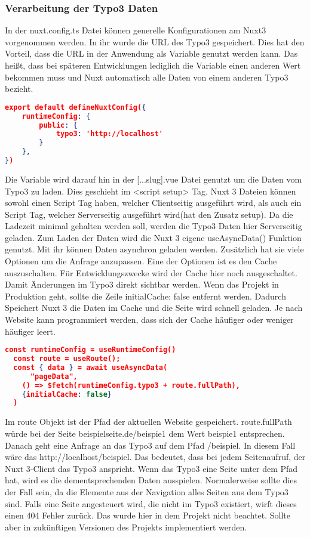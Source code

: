\subsubsection{Verarbeitung der Typo3 Daten}
\label{sec:Verarbeitung der Typo3 Daten}

In der nuxt.config.ts Datei können generelle Konfigurationen am Nuxt3 vorgenommen werden. In ihr wurde die URL des Typo3 gespeichert. Dies hat den Vorteil, dass die URL in der Anwendung als Variable genutzt werden kann. Das heißt, dass bei späteren Entwicklungen lediglich die Variable einen anderen Wert bekommen muss und Nuxt automatisch alle Daten von einem anderen Typo3 bezieht.

\begin{lstlisting}[language=json,firstnumber=1]
export default defineNuxtConfig({
    runtimeConfig: {
        public: {
            typo3: 'http://localhost'
        }
    },
})
\end{lstlisting}

Die Variable wird darauf hin in der [...slug].vue Datei genutzt um die Daten vom Typo3 zu laden. Dies geschieht im <script setup> Tag. Nuxt 3 Dateien können sowohl einen Script Tag haben, welcher Clientseitig ausgeführt wird, als auch ein Script Tag, welcher Serverseitig ausgeführt wird(hat den Zusatz setup). Da die Ladezeit minimal gehalten werden soll, werden die Typo3 Daten hier Serverseitig geladen. Zum Laden der Daten wird die Nuxt 3 eigene useAsyncData() Funktion genutzt. Mit ihr können Daten asynchron geladen werden. Zusätzlich hat sie viele Optionen um die Anfrage anzupassen. Eine der Optionen ist es den Cache auszuschalten. Für Entwicklungszwecke wird der Cache hier noch ausgeschaltet. Damit Änderungen im Typo3 direkt sichtbar werden. Wenn das Projekt in Produktion geht, sollte die Zeile {initialCache: false} entfernt werden. Dadurch Speichert Nuxt 3 die Daten im Cache und die Seite wird schnell geladen. Je nach Website kann programmiert werden, dass sich der Cache häufiger oder weniger häufiger leert.

\begin{lstlisting}[language=json,firstnumber=1]
  const runtimeConfig = useRuntimeConfig()
  const route = useRoute();
  const { data } = await useAsyncData(
      "pageData",
    () => $fetch(runtimeConfig.typo3 + route.fullPath),
    {initialCache: false}
  )
\end{lstlisting}

Im route Objekt ist der Pfad der aktuellen Website gespeichert. route.fullPath würde bei der Seite beispielseite.de/beispie1 dem Wert beispie1 entsprechen. Danach geht eine Anfrage an das Typo3 auf dem Pfad /beispiel. In diesem Fall wäre das http://localhost/beispiel. Das bedeutet, dass bei jedem Seitenaufruf, der Nuxt 3-Client das Typo3 anspricht. Wenn das Typo3 eine Seite unter dem Pfad hat, wird es die dementsprechenden Daten ausspielen. Normalerweise sollte dies der Fall sein, da die Elemente aus der Navigation alles Seiten aus dem Typo3 sind. Falls eine Seite angesteuert wird, die nicht im Typo3 existiert, wirft dieses einen 404 Fehler zurück. Das wurde hier in dem Projekt nicht beachtet. Sollte aber in zukünftigen Versionen des Projekts implementiert werden.

